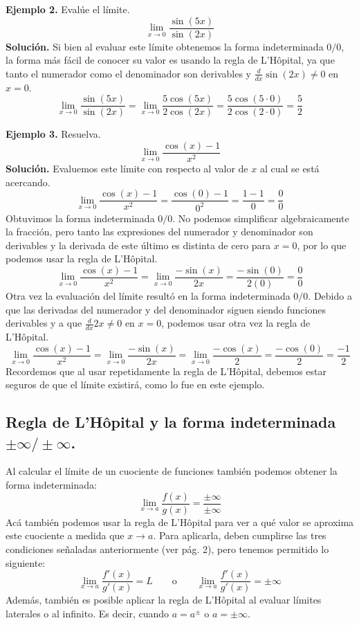 \documentclass[12pt]{article}
\begin{document}
\textbf{Ejemplo 2.} Evalúe el límite.
\[
  \lim_{x \to 0} \frac{\sin(5x)}{\sin(2x)}
\]
\textbf{Solución.} Si bien al evaluar este límite obtenemos la forma indeterminada $0/0$, la forma más fácil de conocer su valor es usando la regla de L'Hôpital, ya que tanto el numerador como el denominador son derivables y $\frac{d}{dx} \sin(2x) \neq 0$ en $x = 0$.
\[
  \lim_{x \to 0} \frac{\sin(5x)}{\sin(2x)} = \lim_{x \to 0} \frac{5 \cos(5x)}{2 \cos(2x)}
                                           = \frac{5 \cos(5 \cdot 0)}{2 \cos(2 \cdot 0)}
                                           = \frac{5}{2}
\]

\textbf{Ejemplo 3.} Resuelva.
\[
  \lim_{x \to 0} \frac{\cos(x) - 1}{x^{2}}
\]
\textbf{Solución.} Evaluemos este límite con respecto al valor de $x$ al cual se está acercando.
\[
  \lim_{x \to 0} \frac{\cos(x) - 1}{x^{2}} = \frac{\cos(0) - 1}{0^{2}} = \frac{1 - 1}{0} = \frac{0}{0}
\]
Obtuvimos la forma indeterminada $0/0$. No podemos simplificar algebraicamente la fracción, pero tanto las expresiones del numerador y denominador son derivables y la derivada de este último es distinta de cero para $x = 0$, por lo que podemos usar la regla de L'Hôpital.
\[
  \lim_{x \to 0} \frac{\cos(x) - 1}{x^{2}} = \lim_{x \to 0} \frac{- \sin(x)}{2x} = \frac{- \sin(0)}{2(0)} = \frac{0}{0}
\]
Otra vez la evaluación del límite resultó en la forma indeterminada $0/0$. Debido a que las derivadas del numerador y del denominador siguen siendo funciones derivables y a que $\frac{d}{dx} 2x \neq 0$ en $x = 0$, podemos usar otra vez la regla de L'Hôpital.
\[
  \lim_{x \to 0} \frac{\cos(x) - 1}{x^{2}} = \lim_{x \to 0} \frac{- \sin(x)}{2x}
                                           = \lim_{x \to 0} \frac{- \cos(x)}{2}
                                           = \frac{- \cos(0)}{2}
                                           = \frac{-1}{2}
\]
Recordemos que al usar repetidamente la regla de L'Hôpital, debemos estar seguros de que el límite existirá, como lo fue en este ejemplo.

\subsection{Regla de L'Hôpital y la forma indeterminada \texorpdfstring{$\pm \infty / \pm \infty$}{infinito sobre infinito}.}

Al calcular el límite de un cuociente de funciones también podemos obtener la forma indeterminada:
\[
  \lim_{x \to a} \frac{f(x)}{g(x)} = \frac{\pm \infty}{\pm \infty}
\]
Acá también podemos usar la regla de L'Hôpital para ver a qué valor se aproxima este cuociente a medida que $x \to a$. Para aplicarla, deben cumplirse las tres condiciones señaladas anteriormente (ver pág. 2), pero tenemos permitido lo siguiente:
\[
  \lim_{x \to a} \frac{f'(x)}{g'(x)} = L \qquad \mathrm{o} \qquad \lim_{x \to a} \frac{f'(x)}{g'(x)} = \pm \infty
\]
Además, también es posible aplicar la regla de L'Hôpital al evaluar límites laterales o al infinito. Es decir, cuando $a = a^{\pm}$ o $a = \pm \infty$.
\end{document}
